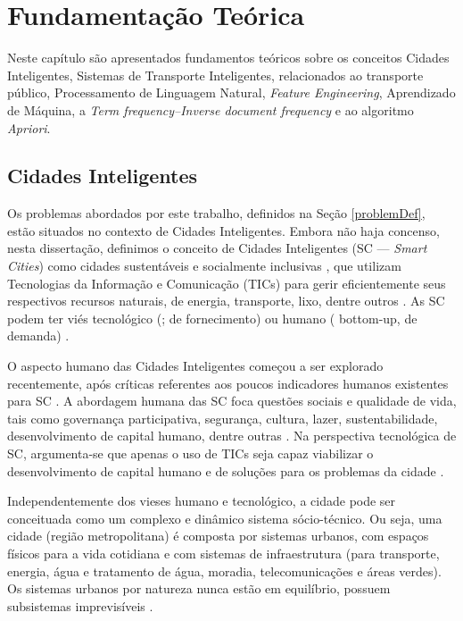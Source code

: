 \documentclass[
	12pt,				%
	oneside,			%
	a4paper,			%
	english,			%
	brazil				%
	]{abntex2ppgsi}
\begin{document}
{%

\chapter{Fundamentação Teórica}
\label{fundamentacao}
Neste capítulo são apresentados fundamentos teóricos sobre os conceitos Cidades Inteligentes, Sistemas de Transporte Inteligentes, relacionados ao transporte público, Processamento de Linguagem Natural, \textit{Feature Engineering}, Aprendizado de Máquina, a \textit{Term frequency–Inverse document frequency} e ao algoritmo \textit{Apriori}.

\section{Cidades Inteligentes}
\label{smartCities}

Os problemas abordados por este trabalho, definidos na Seção \ref{problemDef}, estão situados no contexto de Cidades Inteligentes. Embora não haja concenso, nesta dissertação, definimos o conceito de Cidades Inteligentes (SC --- \textit{Smart Cities}) como cidades sustentáveis e socialmente inclusivas \cite{Wang2017}, que utilizam Tecnologias da Informação e Comunicação (TICs) para gerir eficientemente seus respectivos recursos naturais, de energia, transporte, lixo, dentre outros \cite{Ahvenniemi2017}. As SC podem ter viés tecnológico (; de fornecimento) ou humano ( bottom-up, de demanda) \cite{Kummitha2017}. 

O aspecto humano das Cidades Inteligentes começou a ser explorado recentemente, após críticas referentes aos poucos indicadores humanos existentes para SC \cite{Ahvenniemi2017} \cite{Finger2017}. A abordagem humana das SC foca questões sociais e qualidade de vida, tais como governança participativa, segurança, cultura, lazer, sustentabilidade, desenvolvimento de capital humano, dentre outras  \cite{Ahvenniemi2017}. Na perspectiva tecnológica de SC, argumenta-se que apenas o uso de TICs seja capaz viabilizar o desenvolvimento de capital humano e de soluções para os problemas da cidade \cite{Kummitha2017}.

Independentemente dos vieses humano e tecnológico, a cidade pode ser conceituada como um complexo e dinâmico sistema sócio-técnico. Ou seja, uma cidade (região metropolitana) é composta por sistemas urbanos, com espaços físicos para a vida cotidiana e com sistemas de infraestrutura (para transporte, energia, água e tratamento de água, moradia, telecomunicações e áreas verdes). Os sistemas urbanos por natureza nunca estão em equilíbrio, possuem subsistemas imprevisíveis \cite{Finger2017}.

}
\end{document}
